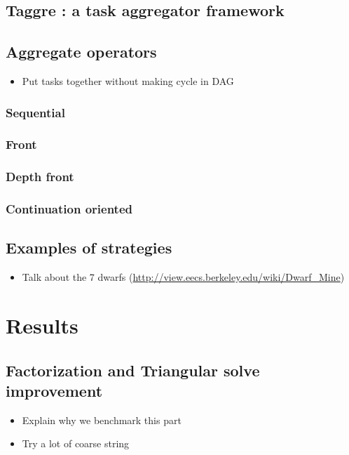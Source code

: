 \documentclass[oneside,12t]{classes/Thesis}
\begin{document}
\subsection{Taggre : a task aggregator framework}
\subsection{Aggregate operators}
  \begin{itemize}
    \item Put tasks together without making cycle in DAG
  \end{itemize}
\subsubsection{Sequential}
\subsubsection{Front}
\subsubsection{Depth front}
\subsubsection{Continuation oriented}
\subsection{Examples of strategies}
  \begin{itemize}
    \item Talk about the 7 dwarfs (\url{http://view.eecs.berkeley.edu/wiki/Dwarf_Mine})
  \end{itemize}




\section{Results}
\subsection{Factorization and Triangular solve improvement}
  \begin{itemize}
    \item Explain why we benchmark this part
    \item Try a lot of coarse string
  \end{itemize}
\end{document}
